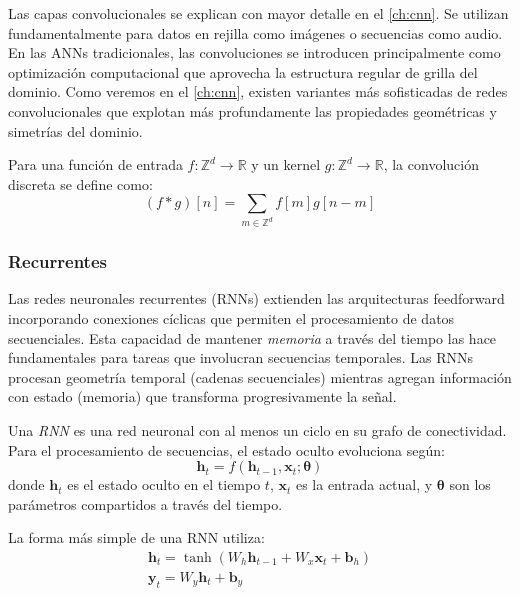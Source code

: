 Las capas convolucionales se explican con mayor detalle en el \autoref{ch:cnn}. Se utilizan fundamentalmente para datos en rejilla como imágenes o secuencias como audio. En las \glspl{ANN} tradicionales, las convoluciones se introducen principalmente como optimización computacional que aprovecha la estructura regular de grilla del dominio. Como veremos en el \autoref{ch:cnn}, existen variantes más sofisticadas de redes convolucionales que explotan más profundamente las propiedades geométricas y simetrías del dominio.

\begin{definition}\label{def:convolucion_discreta}
	Para una función de entrada $f: \mathbb{Z}^d \to \mathbb{R}$ y un kernel $g: \mathbb{Z}^d \to \mathbb{R}$, la convolución discreta se define como:
	\[
	(f * g)[n] = \sum_{m \in \mathbb{Z}^d} f[m] g[n - m]
	\]
\end{definition}

\subsubsection{Recurrentes}\label{subsubsec:rnn}

Las redes neuronales recurrentes (\glspl{RNN}) extienden las arquitecturas feedforward incorporando conexiones cíclicas que permiten el procesamiento de datos secuenciales. Esta capacidad de mantener \textit{memoria} a través del tiempo las hace fundamentales para tareas que involucran secuencias temporales. Las \glspl{RNN} procesan geometría temporal (cadenas secuenciales) mientras agregan información con estado (memoria) que transforma progresivamente la señal.

\begin{definition}\label{def:rnn}
	Una \textit{\gls{RNN}} es una red neuronal con al menos un ciclo en su grafo de conectividad. Para el procesamiento de secuencias, el estado oculto evoluciona según:
	\[
	\mathbf{h}_t = f(\mathbf{h}_{t-1}, \mathbf{x}_t; \boldsymbol{\theta})
	\]
	donde $\mathbf{h}_t$ es el estado oculto en el tiempo $t$, $\mathbf{x}_t$ es la entrada actual, y $\boldsymbol{\theta}$ son los parámetros compartidos a través del tiempo.
\end{definition}

La forma más simple de una \gls{RNN} utiliza:
\begin{gather*}
    \mathbf{h}_t = \tanh(W_h \mathbf{h}_{t-1} + W_x \mathbf{x}_t + \mathbf{b}_h)\\
    \mathbf{y}_t = W_y \mathbf{h}_t + \mathbf{b}_y\\
\end{gather*}

